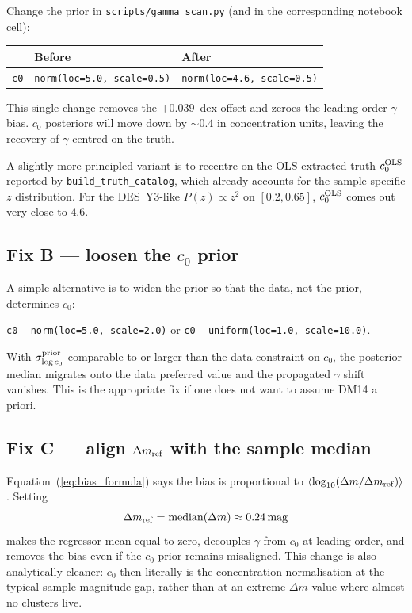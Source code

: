 \documentclass[11pt,a4paper]{article}
\newcommand{\dm}{\Delta m}
\newcommand{\dmref}{\dm_{\rm ref}}
\begin{document}
Change the prior in \texttt{scripts/gamma\_scan.py} (and in the corresponding
notebook cell):
\begin{center}
\begin{tabular}{lll}
\toprule
& Before & After \\
\midrule
\texttt{c0} & \texttt{norm(loc=5.0, scale=0.5)} & \texttt{norm(loc=4.6, scale=0.5)} \\
\bottomrule
\end{tabular}
\end{center}
This single change removes the $+0.039$~dex offset and zeroes the leading-order
$\gamma$ bias.  $c_0$ posteriors will move down by $\sim 0.4$ in concentration
units, leaving the recovery of $\gamma$ centred on the truth.

A slightly more principled variant is to recentre on the OLS-extracted truth
$c_0^{\rm OLS}$ reported by \texttt{build\_truth\_catalog}, which already
accounts for the sample-specific $z$ distribution.  For the DES~Y3-like
$P(z) \propto z^2$ on $[0.2, 0.65]$, $c_0^{\rm OLS}$ comes out very close to
$4.6$.

\subsection*{Fix B — loosen the $c_0$ prior}

A simple alternative is to widen the prior so that the data, not the prior,
determines $c_0$:
\begin{center}
\texttt{c0} ~ \texttt{norm(loc=5.0, scale=2.0)} \quad or \quad
\texttt{c0} ~ \texttt{uniform(loc=1.0, scale=10.0)}.
\end{center}
With $\sigma^{\rm prior}_{\log c_0}$ comparable to or larger than the data
constraint on $c_0$, the posterior median migrates onto the data preferred
value and the propagated $\gamma$ shift vanishes.  This is the appropriate
fix if one does not want to assume DM14 a priori.

\subsection*{Fix C — align $\dmref$ with the sample median}

Equation~(\ref{eq:bias_formula}) says the bias is proportional to
$\langle\log_{10}(\dm/\dmref)\rangle$.  Setting
\begin{equation}
  \dmref = \mathrm{median}(\dm) \approx 0.24\,\mathrm{mag}
\end{equation}
makes the regressor mean equal to zero, decouples $\gamma$ from $c_0$ at
leading order, and removes the bias even if the $c_0$ prior remains
misaligned.  This change is also analytically cleaner: $c_0$ then literally
is the concentration normalisation at the typical sample magnitude gap,
rather than at an extreme $\dm$ value where almost no clusters live.
\end{document}
